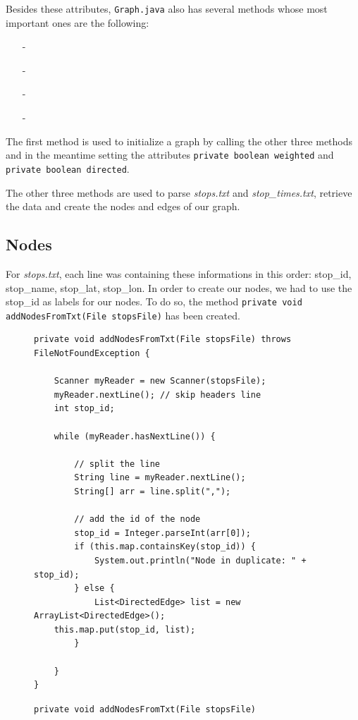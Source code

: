 \documentclass{article}
\begin{document}
	Besides these attributes, \texttt{Graph.java} also has several methods whose most important ones are the following:

\begin{itemize}
\item[-]
\item[-]
\item[-]
\item[-]
\end{itemize}

\begingroup
\setlength{\rightskip}{0pt plus 1 fil}
The first method is used to initialize a graph by calling the other three methods and in the meantime setting the attributes \texttt{private boolean weighted} and \texttt{private boolean directed}.
\endgroup

The other three methods are used to parse \textit{stops.txt} and \textit{stop\_times.txt}, retrieve the data and create the nodes and edges of our graph.

\subsection{Nodes}

For \textit{stops.txt}, each line was containing these informations in this order: stop\_id, stop\_name, stop\_lat, stop\_lon. In order to create our nodes, we had to use the stop\_id as labels for our nodes. To do so, the method \texttt{private void addNodesFromTxt(File stopsFile)} has been created.

\begin{figure}[h]
\begin{verbatim}
private void addNodesFromTxt(File stopsFile) throws FileNotFoundException {

	Scanner myReader = new Scanner(stopsFile);
	myReader.nextLine(); // skip headers line
	int stop_id;
		
	while (myReader.hasNextLine()) {
			
		// split the line
		String line = myReader.nextLine();
		String[] arr = line.split(",");
		
		// add the id of the node
		stop_id = Integer.parseInt(arr[0]);
		if (this.map.containsKey(stop_id)) {
			System.out.println("Node in duplicate: " + stop_id);
		} else {
			List<DirectedEdge> list = new ArrayList<DirectedEdge>();
	this.map.put(stop_id, list);
		}
			
	}
}	
\end{verbatim}
\caption{\texttt{private void addNodesFromTxt(File stopsFile)}}
\end{figure}
\end{document}
